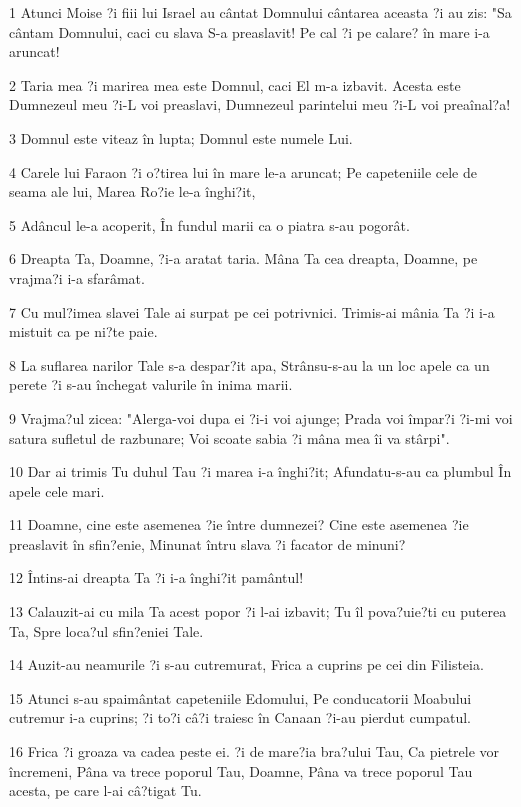 \par 1 Atunci Moise ?i fiii lui Israel au cântat Domnului cântarea aceasta ?i au zis: "Sa cântam Domnului, caci cu slava S-a preaslavit! Pe cal ?i pe calare? în mare i-a aruncat!
\par 2 Taria mea ?i marirea mea este Domnul, caci El m-a izbavit. Acesta este Dumnezeul meu ?i-L voi preaslavi, Dumnezeul parintelui meu ?i-L voi preaînal?a!
\par 3 Domnul este viteaz în lupta; Domnul este numele Lui.
\par 4 Carele lui Faraon ?i o?tirea lui în mare le-a aruncat; Pe capeteniile cele de seama ale lui, Marea Ro?ie le-a înghi?it,
\par 5 Adâncul le-a acoperit, În fundul marii ca o piatra s-au pogorât.
\par 6 Dreapta Ta, Doamne, ?i-a aratat taria. Mâna Ta cea dreapta, Doamne, pe vrajma?i i-a sfarâmat.
\par 7 Cu mul?imea slavei Tale ai surpat pe cei potrivnici. Trimis-ai mânia Ta ?i i-a mistuit ca pe ni?te paie.
\par 8 La suflarea narilor Tale s-a despar?it apa, Strânsu-s-au la un loc apele ca un perete ?i s-au închegat valurile în inima marii.
\par 9 Vrajma?ul zicea: "Alerga-voi dupa ei ?i-i voi ajunge; Prada voi împar?i ?i-mi voi satura sufletul de razbunare; Voi scoate sabia ?i mâna mea îi va stârpi".
\par 10 Dar ai trimis Tu duhul Tau ?i marea i-a înghi?it; Afundatu-s-au ca plumbul În apele cele mari.
\par 11 Doamne, cine este asemenea ?ie între dumnezei? Cine este asemenea ?ie preaslavit în sfin?enie, Minunat întru slava ?i facator de minuni?
\par 12 Întins-ai dreapta Ta ?i i-a înghi?it pamântul!
\par 13 Calauzit-ai cu mila Ta acest popor ?i l-ai izbavit; Tu îl pova?uie?ti cu puterea Ta, Spre loca?ul sfin?eniei Tale.
\par 14 Auzit-au neamurile ?i s-au cutremurat, Frica a cuprins pe cei din Filisteia.
\par 15 Atunci s-au spaimântat capeteniile Edomului, Pe conducatorii Moabului cutremur i-a cuprins; ?i to?i câ?i traiesc în Canaan ?i-au pierdut cumpatul.
\par 16 Frica ?i groaza va cadea peste ei. ?i de mare?ia bra?ului Tau, Ca pietrele vor încremeni, Pâna va trece poporul Tau, Doamne, Pâna va trece poporul Tau acesta, pe care l-ai câ?tigat Tu.
